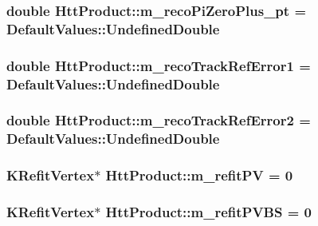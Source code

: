 \label{classHttProduct_a319d9cdf83b816f05085fbe62afe435c}
\hypertarget{classHttProduct_a6e16f6cd5da93ccaa83bc33abc443189}{
\subsubsection[{m\_\-recoPiZeroPlus\_\-pt}]{\setlength{\rightskip}{0pt plus 5cm}double {\bf HttProduct::m\_\-recoPiZeroPlus\_\-pt} = DefaultValues::UndefinedDouble}}
\label{classHttProduct_a6e16f6cd5da93ccaa83bc33abc443189}
\hypertarget{classHttProduct_a4bd6de3ec7586444d48d4d0d89d3deaf}{
\subsubsection[{m\_\-recoTrackRefError1}]{\setlength{\rightskip}{0pt plus 5cm}double {\bf HttProduct::m\_\-recoTrackRefError1} = DefaultValues::UndefinedDouble}}
\label{classHttProduct_a4bd6de3ec7586444d48d4d0d89d3deaf}
\hypertarget{classHttProduct_a95d22008c2a25f1bd7403f12b1f1666e}{
\subsubsection[{m\_\-recoTrackRefError2}]{\setlength{\rightskip}{0pt plus 5cm}double {\bf HttProduct::m\_\-recoTrackRefError2} = DefaultValues::UndefinedDouble}}
\label{classHttProduct_a95d22008c2a25f1bd7403f12b1f1666e}
\hypertarget{classHttProduct_a2e67ba21921d25e857e5265bf53fa1b8}{
\subsubsection[{m\_\-refitPV}]{\setlength{\rightskip}{0pt plus 5cm}KRefitVertex$\ast$ {\bf HttProduct::m\_\-refitPV} = 0}}
\label{classHttProduct_a2e67ba21921d25e857e5265bf53fa1b8}
\hypertarget{classHttProduct_a059310143e55e578c6f0ec5613e79ca6}{
\subsubsection[{m\_\-refitPVBS}]{\setlength{\rightskip}{0pt plus 5cm}KRefitVertex$\ast$ {\bf HttProduct::m\_\-refitPVBS} = 0}}
